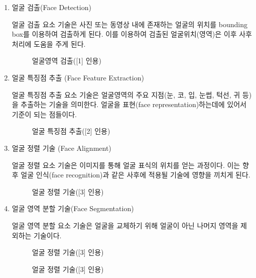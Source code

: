                         
\begin{enumerate}%
    \item  얼굴 검출(Face Detection)

    얼굴 검출 요소 기술은 사진 또는 동영상 내에 존재하는 얼굴의 위치를 bounding box를 이용하여 검출하게 된다. 이를 이용하여 검출된 얼굴위치(영역)은 이후 사후처리에 도움을 주게 된다.

    \begin{figure}[h!]
        \centering
        \caption{얼굴영역 검출([1] 인용)}
    \end{figure}
            
    \item 얼굴 특징점 추출 (Face Feature Extraction)

    얼굴 특징점 추출 요소 기술은 얼굴영역의 주요 지점(눈, 코, 입, 눈썹, 턱선, 귀 등)을 추출하는 기술을 의미한다. 얼굴을 표현(face representation)하는데에 있어서 기준이 되는 점들이다.
    \begin{figure}[h!]
        \centering
        \caption{얼굴 특징점 추출([2] 인용)}
    \end{figure}

    \item 얼굴 정렬 기술 (Face Alignment)

    얼굴 정렬 요소 기술은 이미지를 통해 얼굴 표식의 위치를 얻는 과정이다. 이는 향후 얼굴 인식(face recognition)과 같은 사후에 적용될 기술에 영향을 끼치게 된다.
    \begin{figure}[h!]
        \centering
        \caption{얼굴 정렬 기술([3] 인용)}
    \end{figure}

    \item 얼굴 영역 분할 기술(Face Segmentation)

    얼굴 영역 분할 요소 기술은 얼굴을 교체하기 위해 얼굴이 아닌 나머지 영역을 제외하는 기술이다.

    \begin{figure}[h!]
        \centering
        \caption{ 얼굴 정렬 기술([3] 인용)}
    \end{figure}

    \begin{figure}[h!]
        \centering
        \caption{얼굴 정렬 기술([3] 인용)}
    \end{figure}


\end{enumerate}
